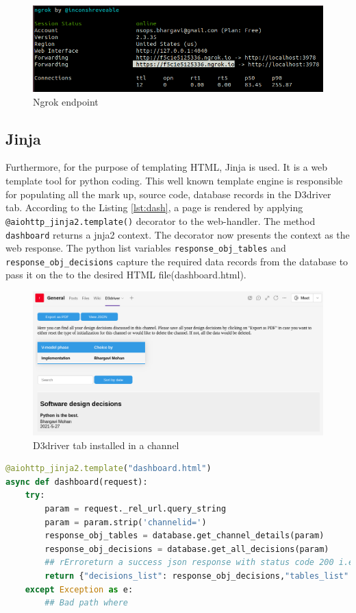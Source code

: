 \begin{figure}[h]
\centering
\includegraphics[width=0.7\linewidth]{figures/ngrok}
\captionsetup{justification=centering}
\caption{Ngrok endpoint}
\label{fig:ngrok}
\end{figure}


\subsection{Jinja}

Furthermore, for the purpose of templating HTML, Jinja is used. It is a web template tool for python coding. This well known template engine is responsible for populating all the mark up, source code, database records in the D3driver tab. According to the Listing \ref{lst:dash}, a page is rendered by applying \texttt{@aiohttp\_jinja2.template()} decorator to the web-handler. The method \texttt{dashboard} returns a jnja2 context. The decorator now presents the context as the web response. The python list variables \texttt{response\_obj\_tables} and \texttt{response\_obj\_decisions} capture the required data records from the database to pass it on the to the desired HTML file(dashboard.html).

\begin{figure}[h]
\centering
\includegraphics[width=0.9\linewidth]{figures/d3dtabnew}
\caption{D3driver tab installed in a channel}
\label{fig:d3dtabnew}
\end{figure}

\begin{lstlisting}[caption={Dashboard method},label={lst:dash},language=python]
@aiohttp_jinja2.template("dashboard.html")
async def dashboard(request):  
    try:
        param = request._rel_url.query_string
        param = param.strip('channelid=')
        response_obj_tables = database.get_channel_details(param)
        response_obj_decisions = database.get_all_decisions(param)
        ## rErroreturn a success json response with status code 200 i.e. 'OK'
        return {"decisions_list": response_obj_decisions,"tables_list":response_obj_tables}
    except Exception as e:
        ## Bad path where 
\end{lstlisting}


